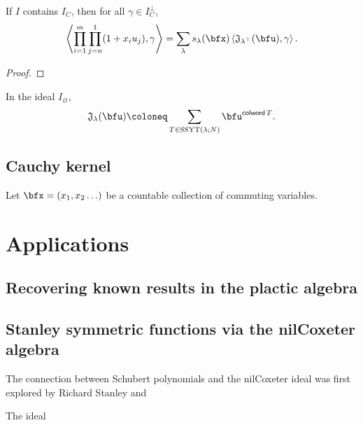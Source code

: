 \documentclass{article}
\newcommand{\ip}[1]{
    \left\langle
        {#1}
    \right\rangle
}
\newcommand*\colword{\operatorname{\mathsf{colword}}}
\newcommand*\frkJ{\mathfrak{J}}
\newcommand*\SSYT{\operatorname{SSYT}}
\begin{document}
\begin{theorem}
    If $I$ contains $I_C$, then for all $\gamma \in I_C^\perp$,
    \[
        \ip{
            \prod_{i=1}^m
            \prod_{j=n}^1
            (1 + x_iu_j),
            \gamma
        }
        =
        \sum_\lambda
        s_\lambda(\bfx)
        \ip{
        \frkJ_{\lambda^\top}(\bfu),\gamma
        }.
    \]
\end{theorem}

\begin{proof}
\end{proof}

\begin{theorem}
    In the ideal $I_\varnothing$,
    \[
        \frkJ_\lambda(\bfu)
        \coloneq
        \sum_{T \in \SSYT(\lambda;N)}
        \bfu^{\colword T}.
    \]
\end{theorem}

\subsection{Cauchy kernel}

\begin{definition}
    Let $\bfx = (x_1,x_2\ldots)$ be a countable collection of commuting variables.
\end{definition}

\section{Applications}

\subsection{Recovering known results in the plactic algebra}

\begin{theorem}
\end{theorem}

\subsection{Stanley symmetric functions via the nilCoxeter algebra}

The connection between Schubert polynomials and the nilCoxeter ideal was first explored by Richard Stanley and 

\begin{definition}
    The  ideal
\end{definition}
\end{document}
